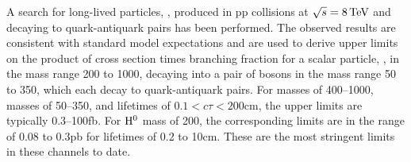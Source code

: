 A search for long-lived particles, \X, produced in pp collisions at $\sqrt{s} = 8\,\text{Te\hspace{-.08em}V}$ and decaying
to quark-antiquark pairs has been performed.
The observed results are consistent with standard model expectations and are used to derive upper
limits on the product of cross section times branching fraction for a scalar particle,
 \Higgs, in the mass range 200 to 1000\GeV, decaying into a pair of \X bosons in the mass
range 50 to 350\GeV, which each decay to quark-antiquark pairs. For \Higgs masses of 400--1000\GeV, \X
masses of 50--350\GeV, and \X lifetimes of $0.1<c\tau<200$\:cm, the upper limits are typically 0.3--100\:fb.
 For $\mathrm{H}^{0}$ mass of 200\GeV, the corresponding limits are in the range of 0.08 to 0.3\:pb for \X
lifetimes of 0.2 to 10\:cm. These are the most stringent limits in these channels to date.
